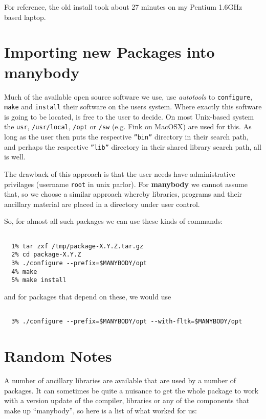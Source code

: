 For reference, the old install took about 27 minutes on my Pentium 1.6GHz based
laptop.

\section{Importing new Packages into manybody}

Much of the available open source software we use, use
{\it autotools} to {\tt configure}, {\tt make} and {\tt install} their
software on the users system. Where exactly this software is going to be located,
is free to the user to decide. On most Unix-based system the {\tt usr},
{\tt /usr/local}, {\tt /opt} or {\tt /sw} (e.g. Fink on MacOSX) are used for this.
As long
as the user then puts the respective {\tt ''bin''} directory in their search
path, and perhaps the respective {\tt ''lib''}  directory in their 
shared library search path, all is well.

The drawback of this approach is that the user needs have administrative
privilages (username {\tt root} in unix parlor). For {\bf manybody} we
cannot assume that, so we choose a similar approach whereby libraries, programs
and their ancillary material are placed in a directory under user control.


So, for almost all such packages we can use these kinds of commands:

\footnotesize\begin{verbatim}

  1% tar zxf /tmp/package-X.Y.Z.tar.gz
  2% cd package-X.Y.Z
  3% ./configure --prefix=$MANYBODY/opt
  4% make
  5% make install

\end{verbatim}\normalsize

and for packages that depend on these, we would use

\footnotesize\begin{verbatim}

  3% ./configure --prefix=$MANYBODY/opt --with-fltk=$MANYBODY/opt

\end{verbatim}\normalsize


\section{Random Notes}

A number of ancillary libraries are available that are used by a number
of packages. It can sometimes be quite a nuisance to get the whole package
to work with a version update of the compiler, libraries or any of the
components that make up ``manybody'', so here is a list of what worked
for us:


